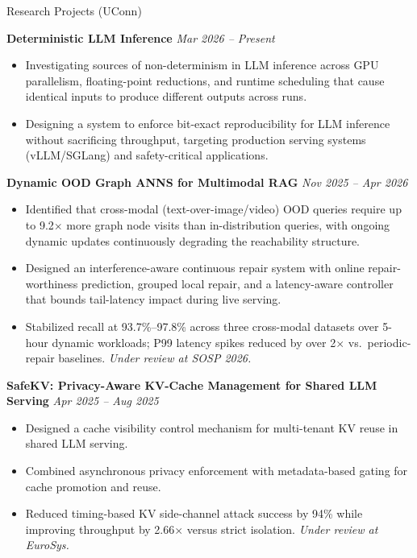 \documentclass[]{resume}
\newcommand{\sectionvspace}{\vspace{1.5pt}}
\begin{document}
\begin{rSection}{Research Projects (UConn)}\sectionvspace

\textbf{Deterministic LLM Inference} \hfill \textit{Mar 2026 -- Present}
\begin{itemize}[leftmargin=1.2em, itemsep=0.2em, topsep=0.2em]
    \item Investigating sources of non-determinism in LLM inference across GPU parallelism, floating-point reductions, and runtime scheduling that cause identical inputs to produce different outputs across runs.
    \item Designing a system to enforce bit-exact reproducibility for LLM inference without sacrificing throughput, targeting production serving systems (vLLM/SGLang) and safety-critical applications.
\end{itemize}

\vspace{0.5ex}
\textbf{Dynamic OOD Graph ANNS for Multimodal RAG} \hfill \textit{Nov 2025 -- Apr 2026}
\begin{itemize}[leftmargin=1.2em, itemsep=0.2em, topsep=0.2em]
    \item Identified that cross-modal (text-over-image/video) OOD queries require up to 9.2$\times$ more graph node visits than in-distribution queries, with ongoing dynamic updates continuously degrading the reachability structure.
    \item Designed an interference-aware continuous repair system with online repair-worthiness prediction, grouped local repair, and a latency-aware controller that bounds tail-latency impact during live serving.
    \item Stabilized recall at 93.7\%--97.8\% across three cross-modal datasets over 5-hour dynamic workloads; P99 latency spikes reduced by over 2$\times$ vs.\ periodic-repair baselines. \textit{Under review at SOSP 2026.}
\end{itemize}

\vspace{0.5ex}
\textbf{SafeKV: Privacy-Aware KV-Cache Management for Shared LLM Serving} \hfill \textit{Apr 2025 -- Aug 2025}
\begin{itemize}[leftmargin=1.2em, itemsep=0.2em, topsep=0.2em]
    \item Designed a cache visibility control mechanism for multi-tenant KV reuse in shared LLM serving.
    \item Combined asynchronous privacy enforcement with metadata-based gating for cache promotion and reuse.
    \item Reduced timing-based KV side-channel attack success by 94\% while improving throughput by 2.66$\times$ versus strict isolation. \textit{Under review at EuroSys.}
\end{itemize}


\end{rSection}
\end{document}
